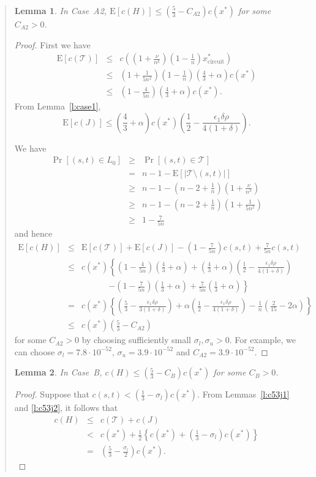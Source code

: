 \documentclass[11pt,letterpaper]{article}
\newtheorem{lemma}{Lemma}
\newcommand{\E}{\mathrm{E}}
\begin{document}
\begin{quote}
\begin{lemma}
\label{l:fca2}
In Case~A2, $\E[c(H)]\leq (\frac{5}{3}-C_{A2})c(x^*)$ for some $C_{A2}>0$.
\end{lemma}
\begin{proof}
First we have\begin{eqnarray*}
\E[c(\mathscr{T})] &\leq& c\left((1+\frac{\nu}{n^k})(1-\frac{1}{n})x^*_{\mathrm{circuit}}\right)\\
&\leq& (1+\frac{1}{5n^2})(1-\frac{1}{n})(\frac{4}{3}+\alpha)c(x^*)\\
&\leq& (1-\frac{4}{5n})(\frac{4}{3}+\alpha)c(x^*)
.\end{eqnarray*}From Lemma~\ref{l:case1},\[
\E[c(J)]\leq(\frac{4}{3}+\alpha)c(x^*)(\frac{1}{2}-\frac{\epsilon_1\delta\rho}{4(1+\delta)})
.\]

We have\begin{eqnarray*}
\Pr[(s,t)\in L_0] &\geq& \Pr[(s,t)\in \mathscr{T}]\\
&=& n-1-\E[|\mathscr{T}\setminus(s,t)|]\\
&\geq& n-1-(n-2+\frac{1}{n})(1+\frac{\nu}{n^k})\\
&\geq& n-1-(n-2+\frac{1}{n})(1+\frac{1}{5n^2})\\
&\geq& 1-\frac{7}{5n}
\end{eqnarray*}and hence\begin{eqnarray*}
\E[c(H)]&\leq&\E[c(\mathscr{T})]+\E[c(J)]-(1-\frac{7}{5n})c(s,t)+\frac{7}{5n}c(s,t)\\
&\leq&c(x^*)\left\{(1-\frac{4}{5n})(\frac{4}{3}+\alpha)+(\frac{4}{3}+\alpha)(\frac{1}{2}-\frac{\epsilon_1\delta\rho}{4(1+\delta)})\right.\\
&&\phantom{c(x^*)}\left.-(1-\frac{7}{5n})(\frac{1}{3}+\alpha)+\frac{7}{5n}(\frac{1}{3}+\alpha)\right\}\\
&=&c(x^*)\left\{(\frac{5}{3}-\frac{\epsilon_1\delta\rho}{3(1+\delta)})+\alpha(\frac{1}{2}-\frac{\epsilon_1\delta\rho}{4(1+\delta)}) -\frac{1}{n} (\frac{2}{15}-2\alpha) \right\}\\
&\leq&c(x^*)(\frac{5}{3}-C_{A2})
\end{eqnarray*}for some $C_{A2}>0$ by choosing sufficiently small $\sigma_l,\sigma_u>0$. For example, we can choose $\sigma_l=7.8\cdot 10^{-52}$, $\sigma_u=3.9\cdot 10^{-52}$ and $C_{A2}=3.9\cdot 10^{-52}$.
\end{proof}

\begin{lemma}
\label{l:fcb}
In Case~B, $c(H)\leq (\frac{5}{3}-C_B)c(x^*)$ for some $C_B>0$.
\end{lemma}
\begin{proof}
Suppose that $c(s,t)<(\frac{1}{3}-\sigma_l)c(x^*)$. From Lemmas~\ref{l:c53j1} and \ref{l:c53j2}, it follows that\begin{eqnarray*}
c(H)&\leq& c(\mathscr{T})+c(J)\\
&<& c(x^*)+\frac{1}{2} \left\{c(x^*)+ (\frac{1}{3}-\sigma_l)c(x^*) \right\}\\
&=& \left(\frac{5}{3}-\frac{\sigma_l}{2}\right) c(x^*)
.\end{eqnarray*}


\end{proof}
\end{quote}
\end{document}

